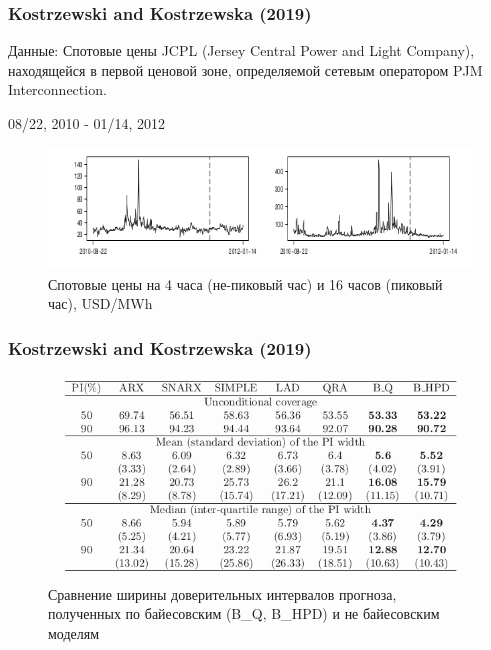 \documentclass[c, dvipsnames]{beamer}  %
\begin{document}
\begin{frame}[shrink=5]
\frametitle{Kostrzewski and Kostrzewska (2019)} 

Данные: Спотовые цены JCPL (Jersey Central Power and Light Company), находящейся   в первой  ценовой зоне, определяемой сетевым оператором PJM Interconnection.

08/22, 2010 -  01/14, 2012

\begin{figure}
	\centering
	\includegraphics[width=0.7\linewidth]{screenshot012}
	\caption{Спотовые цены на 4 часа (не-пиковый час) и 16 часов (пиковый час), USD/MWh }
	\label{fig:screenshot006}
\end{figure}



\end{frame}





\begin{frame}[shrink=5]
\frametitle{Kostrzewski and Kostrzewska (2019)} 


\begin{figure}
	\centering
	\includegraphics[width=0.7\linewidth]{screenshot006}
	\caption{Сравнение ширины доверительных интервалов прогноза, полученных по байесовским (B\_Q, B\_HPD) и не байесовским моделям}
	\label{fig:screenshot006}
\end{figure}




\end{frame}






%
%
%
%
%
%
%
%
\end{document}
